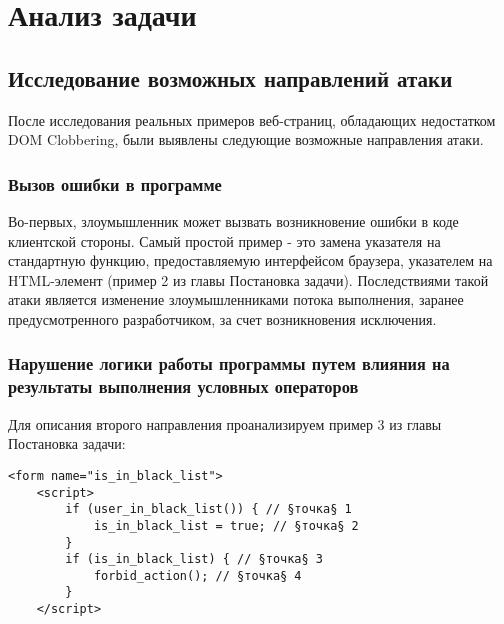 
\chapter{Анализ задачи}\label{Analysis}

\section{Исследование возможных направлений атаки}

После исследования реальных примеров веб-страниц, обладающих недостатком DOM Clobbering, были выявлены следующие возможные направления атаки.
\bigskip

\subsection{Вызов ошибки в программе}
Во-первых, злоумышленник может вызвать возникновение ошибки в коде клиентской стороны. Самый простой пример - это замена указателя на стандартную функцию, предоставляемую интерфейсом браузера, указателем на HTML-элемент (пример 2 из главы Постановка задачи). Последствиями такой атаки является изменение злоумышленниками потока выполнения, заранее предусмотренного разработчиком, за счет возникновения исключения.


\subsection{Нарушение логики работы программы путем влияния на результаты выполнения условных операторов}
Для описания второго направления проанализируем пример 3 из главы Постановка задачи:

\begin{lstlisting}[caption=обход логики программы]
	<form name="is_in_black_list">
	<script>
		if (user_in_black_list()) { // §точка§ 1
			is_in_black_list = true; // §точка§ 2
		}
		if (is_in_black_list) { // §точка§ 3
			forbid_action(); // §точка§ 4
		}
	</script>
\end{lstlisting}
\bigskip

